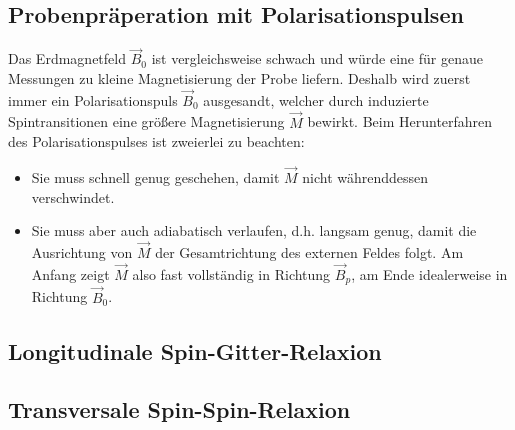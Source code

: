 \documentclass[../main.tex]{subfiles}
\begin{document}
\subsection{Probenpräperation mit Polarisationspulsen}

    Das Erdmagnetfeld $\vec B_0$ ist vergleichsweise schwach und würde eine für genaue Messungen zu kleine Magnetisierung der Probe liefern. Deshalb wird zuerst immer ein Polarisationspuls $\vec B_0$ ausgesandt, welcher durch induzierte Spintransitionen eine größere Magnetisierung $\vec M$ bewirkt. Beim Herunterfahren des Polarisationspulses ist zweierlei zu beachten:
    \begin{itemize}
        \item Sie muss schnell genug geschehen, damit $\vec M$ nicht währenddessen verschwindet.
        \item Sie muss aber auch adiabatisch verlaufen, d.h. langsam genug, damit die Ausrichtung von $\vec M$ der Gesamtrichtung des externen Feldes folgt. Am Anfang zeigt $\vec M$ also fast vollständig in Richtung $\vec B_p$, am Ende idealerweise in Richtung $\vec B_0$. %
    \end{itemize}

\subsection{Longitudinale Spin-Gitter-Relaxion}

\subsection{Transversale Spin-Spin-Relaxion}
\end{document}
